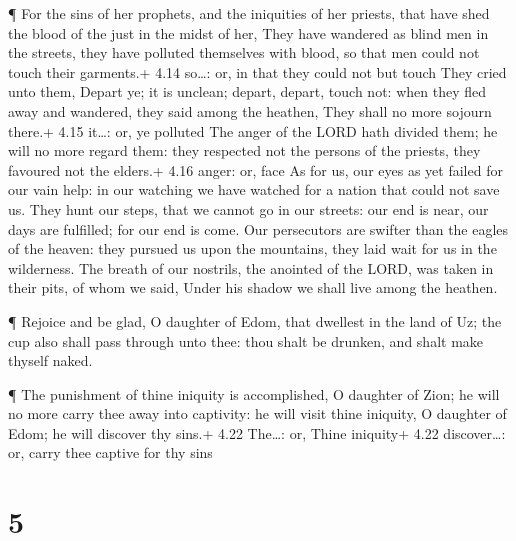  ¶ For the sins of her prophets, and the iniquities of her
priests, that have shed the blood of the just in the midst of her,
 They have wandered as blind men in the streets, they have
polluted themselves with blood, so that men could not touch their
garments.+ 4.14 so\ldots: or, in that they could not but touch
 They cried unto them, Depart ye; it is unclean; depart,
depart, touch not: when they fled away and wandered, they said among the
heathen, They shall no more sojourn there.+ 4.15 it\ldots: or, ye
polluted  The anger of the LORD hath divided them; he will
no more regard them: they respected not the persons of the priests, they
favoured not the elders.+ 4.16 anger: or, face  As for us,
our eyes as yet failed for our vain help: in our watching we have
watched for a nation that could not save us.  They hunt our
steps, that we cannot go in our streets: our end is near, our days are
fulfilled; for our end is come.  Our persecutors are
swifter than the eagles of the heaven: they pursued us upon the
mountains, they laid wait for us in the wilderness.  The
breath of our nostrils, the anointed of the LORD, was taken in their
pits, of whom we said, Under his shadow we shall live among the heathen.

 ¶ Rejoice and be glad, O daughter of Edom, that dwellest
in the land of Uz; the cup also shall pass through unto thee: thou shalt
be drunken, and shalt make thyself naked.

 ¶ The punishment of thine iniquity is accomplished, O
daughter of Zion; he will no more carry thee away into captivity: he
will visit thine iniquity, O daughter of Edom; he will discover thy
sins.+ 4.22 The\ldots: or, Thine iniquity+ 4.22 discover\ldots: or,
carry thee captive for thy sins

\hypertarget{section-4}{%
\section{5}\label{section-4}}

